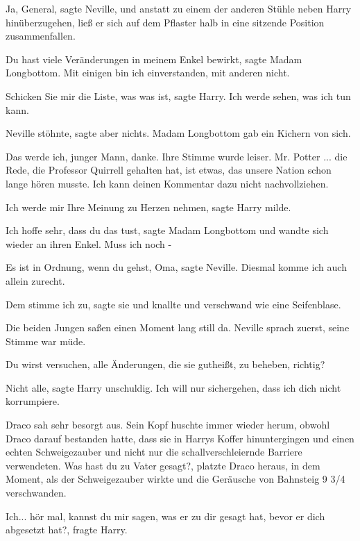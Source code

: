 \glqq{}Ja, General\grqq{}, sagte Neville, und anstatt zu einem der anderen
Stühle neben Harry hinüberzugehen, ließ er sich auf dem Pflaster halb in eine
sitzende Position zusammenfallen.

\glqq{}Du hast viele Veränderungen in meinem Enkel bewirkt\grqq{}, sagte Madam
Longbottom. \glqq{}Mit einigen bin ich einverstanden, mit anderen nicht.\grqq{}

\glqq{}Schicken Sie mir die Liste, was was ist\grqq{}, sagte Harry. \glqq{}Ich
werde sehen, was ich tun kann.\grqq{}

Neville stöhnte, sagte aber nichts. Madam Longbottom gab ein Kichern von sich.

\glqq{}Das werde ich, junger Mann, danke.\grqq{} Ihre Stimme wurde leiser. \glqq{}Mr.
Potter ... die Rede, die Professor Quirrell gehalten hat, ist etwas, das unsere
Nation schon lange hören musste. Ich kann deinen Kommentar dazu nicht
nachvollziehen.\grqq{}

\glqq{}Ich werde mir Ihre Meinung zu Herzen nehmen\grqq{}, sagte Harry milde.

\glqq{}Ich hoffe sehr, dass du das tust\grqq{}, sagte Madam Longbottom und
wandte sich wieder an ihren Enkel. \glqq{}Muss ich noch -\grqq{}

\glqq{}Es ist in Ordnung, wenn du gehst, Oma\grqq{}, sagte Neville.
\glqq{}Diesmal komme ich auch allein zurecht.\grqq{}

\glqq{}Dem stimme ich zu\grqq{}, sagte sie und knallte und verschwand wie eine
Seifenblase.

Die beiden Jungen saßen einen Moment lang still da. Neville sprach zuerst, seine
Stimme war müde.

\glqq{}Du wirst versuchen, alle Änderungen, die sie gutheißt, zu beheben,
richtig?\grqq{}

\glqq{}Nicht alle\grqq{}, sagte Harry unschuldig. \glqq{}Ich will nur
sichergehen, dass ich dich nicht korrumpiere.\grqq{}

Draco sah sehr besorgt aus. Sein Kopf huschte immer wieder herum, obwohl Draco
darauf bestanden hatte, dass sie in Harrys Koffer hinuntergingen und einen
echten Schweigezauber und nicht nur die schallverschleiernde Barriere
verwendeten. \glqq{}Was hast du zu Vater gesagt?\grqq{}, platzte Draco heraus,
in dem Moment, als der Schweigezauber wirkte und die Geräusche von Bahnsteig 9
3/4 verschwanden.

\glqq{}Ich... hör mal, kannst du mir sagen, was er zu dir gesagt hat, bevor er
dich abgesetzt hat?\grqq{}, fragte Harry.

